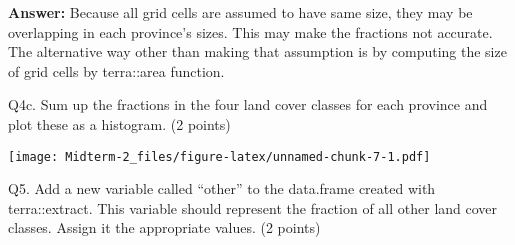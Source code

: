\documentclass[
]{article}
\newenvironment{Shaded}{\begin{snugshade}}{\end{snugshade}}
\newcommand{\AttributeTok}[1]{\textcolor[rgb]{0.77,0.63,0.00}{#1}}
\newcommand{\CommentTok}[1]{\textcolor[rgb]{0.56,0.35,0.01}{\textit{#1}}}
\newcommand{\DecValTok}[1]{\textcolor[rgb]{0.00,0.00,0.81}{#1}}
\newcommand{\FunctionTok}[1]{\textcolor[rgb]{0.00,0.00,0.00}{#1}}
\newcommand{\NormalTok}[1]{#1}
\newcommand{\OtherTok}[1]{\textcolor[rgb]{0.56,0.35,0.01}{#1}}
\newcommand{\SpecialCharTok}[1]{\textcolor[rgb]{0.00,0.00,0.00}{#1}}
\newcommand{\StringTok}[1]{\textcolor[rgb]{0.31,0.60,0.02}{#1}}
\begin{document}
\textbf{Answer:} Because all grid cells are assumed to have same size,
they may be overlapping in each province's sizes. This may make the
fractions not accurate. The alternative way other than making that
assumption is by computing the size of grid cells by terra::area
function.

Q4c. Sum up the fractions in the four land cover classes for each
province and plot these as a histogram. (2 points)

\begin{Shaded}
\end{Shaded}

\texttt{[image: Midterm-2\_files/figure-latex/unnamed-chunk-7-1.pdf]}

Q5. Add a new variable called ``other'' to the data.frame created with
terra::extract. This variable should represent the fraction of all other
land cover classes. Assign it the appropriate values. (2 points)

\begin{Shaded}
\end{Shaded}
\end{document}
